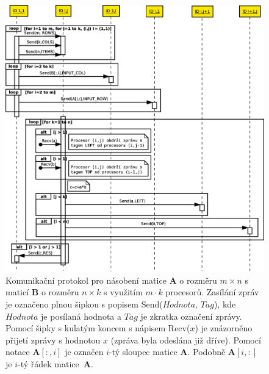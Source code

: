 \documentclass[a4paper,12pt]{article}
\begin{document}
\begin{figure}
  \centering
  \includegraphics[scale=0.3]{Figures/SequenceDiagram.eps}
  \caption{Komunikační protokol pro násobení matice $\mathbf{A}$ o rozměru $m\times n$ s maticí $\mathbf{B}$ o rozměru $n\times k$ s 
  využitím $m\cdot k$ procesorů. Zasílání zpráv je označeno plnou šipkou s popisem Send($Hodnota$, $Tag$), kde $Hodnota$ 
  je posílaná hodnota a $Tag$ je zkratka označení zprávy. Pomocí šipky s kulatým koncem s nápisem Recv($x$) je 
  znázorněno přijetí zprávy s hodnotou $x$ (zpráva byla odeslána již dříve). Pomocí notace $\mathbf{A}[:,i]$ je označen $i$-tý sloupec matice $\mathbf{A}$. 
  Podobně $\mathbf{A}[i,:]$ je $i$-tý řádek matice~$\mathbf{A}$.}
  \label{fig:seq}
\end{figure}
\end{document}
